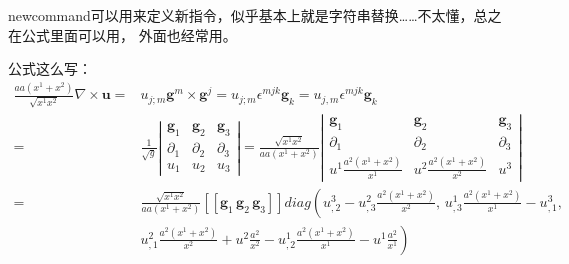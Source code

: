 \documentclass[UTF8,zihao=5]{ctexart} %
\begin{document}
newcommand可以用来定义新指令，似乎基本上就是字符串替换……不太懂，总之在公式里面可以用，
外面也经常用。

\newcommand{\bm}[1]{{\mathbf{#1}}}
\newcommand{\trans}[0]{^\mathrm{T}}
\newcommand{\tran}[1]{#1^\mathrm{T}}
\newcommand{\hermi}[0]{^\mathrm{H}}
\newcommand{\conj}[1]{\overline{#1}}
\newcommand*{\av}[1]{\left\langle{#1}\right\rangle}
\newcommand*{\avld}[1]{\frac{\overline{D}#1}{Dt}}
\newcommand*{\pd}[2]{\frac{\partial #1}{\partial #2}}
\newcommand*{\pdcd}[3]{\frac{\partial^2 #1}{\partial #2 \partial #3}}
\newcommand*{\uu}[0]{\bm{u}}
\newcommand*{\vv}[0]{\bm{v}}
\newcommand*{\g}[0]{\bm{g}}
\newcommand*{\nb}[0]{\bm{\nabla}}




公式这么写：
\begin{equation}
    \begin{aligned}
        \frac{aa(x^1+x^2)}{\sqrt{x^1x^2}}
        \nabla\times\uu
        = & u_{j;m}\g^m\times\g^j
        =u_{j;m}\epsilon^{mjk}\g_k
        =u_{j,m}\epsilon^{mjk}\g_k                           \\
        = & \frac{1}{\sqrt{g}}\left|
        \begin{matrix}
            \g_1       & \g_2       & \g_3       \\
            \partial_1 & \partial_2 & \partial_3 \\
            u_1        & u_2        & u_3
        \end{matrix}
        \right|
        =\frac{\sqrt{x^1x^2}}{aa(x^1+x^2)}
        \left|
        \begin{matrix}
            \g_1                        & \g_2                        & \g_3       \\
            \partial_1                  & \partial_2                  & \partial_3 \\
            u^1\frac{a^2(x^1+x^2)}{x^1} & u^2\frac{a^2(x^1+x^2)}{x^2} & u^3
        \end{matrix}
        \right|                                              \\
        = & \frac{\sqrt{x^1x^2}}{aa(x^1+x^2)}
        [[\g_1\,\g_2\,\g_3]]
        diag\left(
        u^3_{,2}-u^2_{,3}\frac{a^2(x^1+x^2)}{x^2},\,
        u^1_{,3}\frac{a^2(x^1+x^2)}{x^1}-u^3_{,1},\, \right. \\
          & \left.
        u^2_{,1}\frac{a^2(x^1+x^2)}{x^2}+u^2\frac{a^2}{x^2}
        -
        u^1_{,2}\frac{a^2(x^1+x^2)}{x^1}-u^1\frac{a^2}{x^1}
        \right)                                              \\

\end{aligned}
\end{equation}
\end{document}
